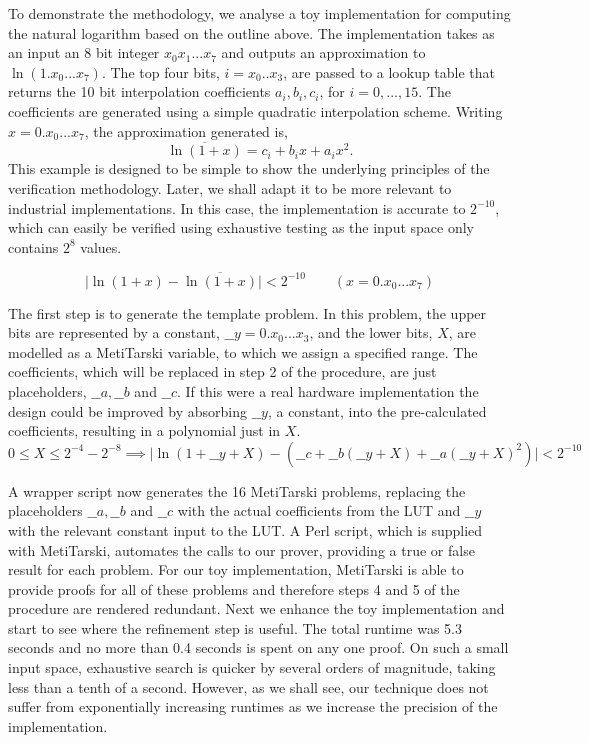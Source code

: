 \documentclass{fac}
\newcommand{\abs}[1]{\lvert#1\rvert}
\begin{document}
To demonstrate the methodology, we analyse a toy implementation for computing the natural logarithm based on the outline above. The implementation takes as an input an 8 bit integer $x_0x_1...x_7$ and outputs an approximation to $\ln(1.x_0...x_7)$. The top four bits, $i = x_0..x_3$, are passed to a lookup table that returns the 10 bit interpolation coefficients $a_i, b_i, c_i$, for $i=0,...,15$. The coefficients are generated using a simple quadratic interpolation scheme. Writing $x=0.x_0...x_7$, the approximation generated is,
\[ \overline{\ln(1+x)}=c_i + b_i x +a_i x^2. \]
This example is designed to be simple to show the underlying principles of the verification methodology. Later, we shall adapt it to be more relevant to industrial implementations. In this case, the implementation is accurate to $2^{-10}$, which can easily be verified using exhaustive testing as the input space only contains $2^8$ values.

\[\abs{\ln(1+x)-\overline{\ln(1+x)}} <2^{-10} \qquad (x= 0.x_0...x_7) \]

The first step is to generate the template problem. In this problem, the upper bits are represented by a constant, $\_\_y=0.x_0...x_3$, and the lower bits, $X$, are modelled as a MetiTarski variable, to which we assign a specified range. The coefficients, which will be replaced in step 2 of the procedure, are just placeholders, $\_\_a, \_\_b$ and $\_\_c$. If this were a real hardware implementation the design could be improved by absorbing $\_\_y$, a constant, into the pre-calculated coefficients, resulting in a polynomial just in $X$.
\[ 0\le X \le 2^{-4}-2^{-8} \implies \abs{\ln(1+\_\_y+X)-(\_\_c+\_\_b(\_\_y+X)+\_\_a(\_\_y+X)^2)} < 2^{-10} \]

A wrapper script now generates the 16 MetiTarski problems, replacing the placeholders $\_\_a, \_\_b$ and $\_\_c$ with the actual coefficients from the LUT and $\_\_y$ with the relevant constant input to the LUT. A Perl script, which is supplied with MetiTarski, automates the calls to our prover, providing a true or false result for each problem. For our toy implementation, MetiTarski is able to provide proofs for all of these problems and therefore steps 4 and 5 of the procedure are rendered redundant. Next we enhance the toy implementation and start to see where the refinement step is useful. The total runtime was 5.3 seconds and no more than 0.4 seconds is spent on any one proof. On such a small input space, exhaustive search is quicker by several orders of magnitude, taking less than a tenth of a second. However, as we shall see, our technique does not suffer from exponentially increasing runtimes as we increase the precision of the implementation. 
\end{document}
